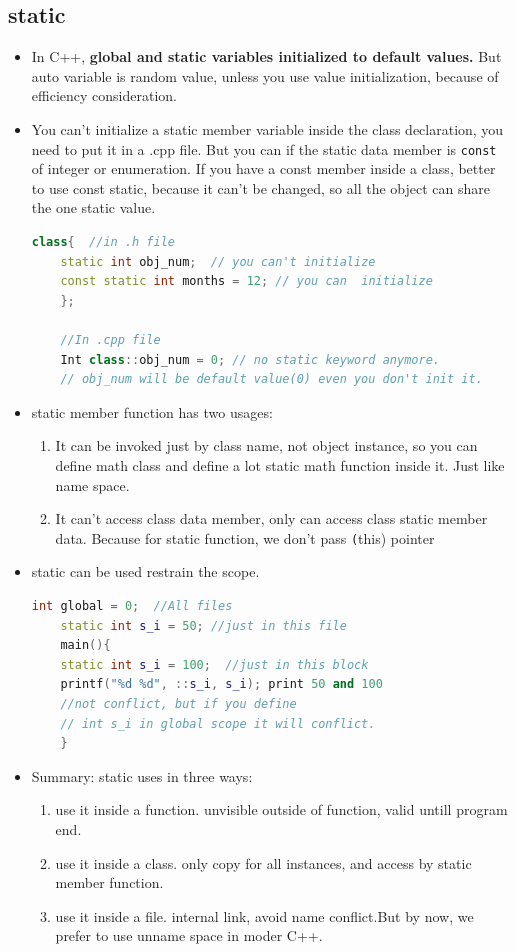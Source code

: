\documentclass[a4paper,11pt,twoside]{book}
\begin{document}
\subsection{static}
\begin{itemize}
	\item In C++, \textbf{global and static variables initialized to default values.}  But auto variable is random value, unless you use value initialization, because of efficiency consideration. 
	
	\item You can't initialize a static member variable inside the class declaration, you need to put it in a .cpp file.   But you can if the static data member is \texttt{const} of integer or enumeration. If you have a const member inside a class, better to use const static, because it can't be changed, so all the object can share the one static value.
	\begin{lstlisting}[frame=single, language=c++]
	class{  //in .h file
	static int obj_num;  // you can't initialize
	const static int months = 12; // you can  initialize
	};
	
	//In .cpp file
	Int class::obj_num = 0; // no static keyword anymore.
	// obj_num will be default value(0) even you don't init it.
	\end{lstlisting}
	
	\item static member function has two usages:
	\begin{enumerate}
		\item It can be invoked just by class name, not object instance, so you can define math class and define a lot static math function inside it.  Just like name space.
		\item It can't access class data member, only can access class static member data. Because for static function, we don't pass \texttt(this) pointer
	\end{enumerate}
	
	\item static can be used restrain the scope.
	\begin{lstlisting}[frame=single, language=c++]
	int global = 0;  //All files
	static int s_i = 50; //just in this file
	main(){
	static int s_i = 100;  //just in this block
	printf("%d %d", ::s_i, s_i); print 50 and 100
	//not conflict, but if you define 
	// int s_i in global scope it will conflict. 
	}
	\end{lstlisting}
	
	\item Summary: static uses in three ways:
	\begin{enumerate}
		\item use it inside a function. unvisible outside of function, valid untill program end.
		
		\item use it inside a class. only copy for all instances, and access by static member function.
		
		\item use it inside a file. internal link, avoid name conflict.But by now, we prefer to use unname space in moder C++.
	\end{enumerate}
\end{itemize}
\end{document}
